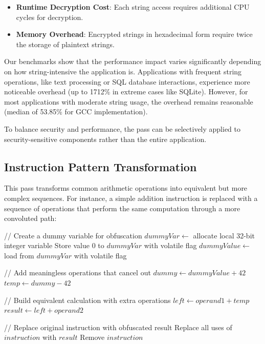 \documentclass[conference]{IEEEtran}
\begin{document}
\begin{itemize}
    \item \textbf{Runtime Decryption Cost}: Each string access requires additional CPU cycles for decryption.
    
    \item \textbf{Memory Overhead}: Encrypted strings in hexadecimal form require twice the storage of plaintext strings.
\end{itemize}

Our benchmarks show that the performance impact varies significantly depending on how string-intensive the application is. Applications with frequent string operations, like text processing or SQL database interactions, experience more noticeable overhead (up to 1712\% in extreme cases like SQLite). However, for most applications with moderate string usage, the overhead remains reasonable (median of 53.85\% for GCC implementation).

To balance security and performance, the pass can be selectively applied to security-sensitive components rather than the entire application.

\subsection{Instruction Pattern Transformation}
This pass transforms common arithmetic operations into equivalent but more complex sequences. For instance, a simple addition instruction is replaced with a sequence of operations that perform the same computation through a more convoluted path:

\begin{algorithm}[H]
\caption{Instruction Pattern Obfuscation (Addition Example)}
\begin{algorithmic}[1]
    \State // Create a dummy variable for obfuscation
    \State $dummyVar \gets$ allocate local 32-bit integer variable
    \State Store value $0$ to $dummyVar$ with volatile flag
    \State $dummyValue \gets$ load from $dummyVar$ with volatile flag
    
    \State // Add meaningless operations that cancel out
    \State $dummy \gets dummyValue + 42$
    \State $temp \gets dummy - 42$ 
    
    \State // Build equivalent calculation with extra operations
    \State $left \gets operand1 + temp$ 
    \State $result \gets left + operand2$ 
    
    \State // Replace original instruction with obfuscated result
    \State Replace all uses of $instruction$ with $result$
    \State Remove $instruction$
\EndProcedure
\end{algorithmic}
\end{algorithm}
\end{document}
